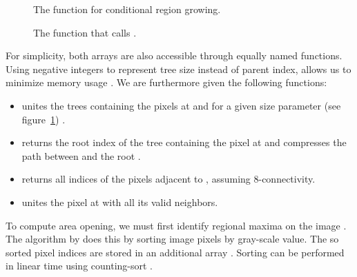 \begin{figure}
  \centering
  
  \caption{The  function for conditional region growing.}
  \label{fig:morphology-algorithm-union}
\end{figure}

\begin{figure}
  \centering
  
  \caption{The  function that calls .}
  \label{fig:morphology-algorithm-uniteNeighbors}
\end{figure}

For simplicity, both arrays are also accessible through equally named
functions. Using negative integers to represent tree size instead of parent
index, allows us to minimize memory usage \cite{Meijster2002Comparison}. We are
furthermore given the following functions:

\begin{itemize}
\item {} unites the trees containing the pixels at
   and  for a given size parameter
   (see figure~\ref{fig:morphology-algorithm-union})
  \cite{Meijster2002Comparison}.

\item {} returns the root index of the tree containing the
  pixel at  and compresses the path between  and the
  root \cite{Tarjan1983Data, Meijster2002Comparison}.

\item {} returns all indices of the pixels adjacent to
  , assuming 8-connectivity.

\item {} unites the pixel at 
  with all its valid neighbors.
\end{itemize}

To compute area opening, we must first identify regional maxima on the image
\cite{Vincent1994Morphological}. The algorithm by \citet{Meijster2002Comparison}
does this by sorting image pixels by gray-scale value. The so sorted pixel
indices are stored in an additional array . Sorting can be
performed in linear time using counting-sort \cite{Meijster2002Comparison}.

